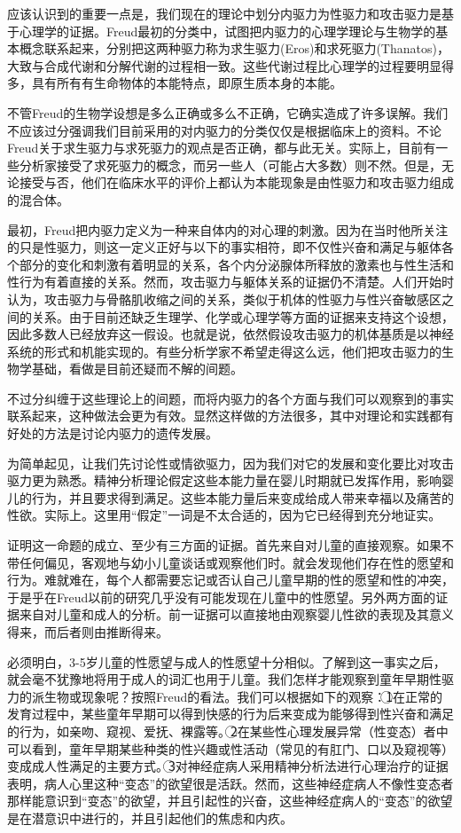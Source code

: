 \documentclass[UTF8,10pt,a4paper,openany]{book}
\newcommand{\quan}[1]{\textcircled{\small #1}}
\begin{document}
应该认识到的重要一点是，我们现在的理论中划分内驱力为性驱力和攻击驱力是基于心理学的证据。Freud最初的分类中，试图把内驱力的心理学理论与生物学的基本概念联系起来，分别把这两种驱力称为求生驱力(Eros)和求死驱力(Thanatos)，大致与合成代谢和分解代谢的过程相一致。这些代谢过程比心理学的过程要明显得多，具有所有有生命物体的本能特点，即原生质本身的本能。

不管Freud的生物学设想是多么正确或多么不正确，它确实造成了许多误解。我们不应该过分强调我们目前采用的对内驱力的分类仅仅是根据临床上的资料。不论Freud关于求生驱力与求死驱力的观点是否正确，都与此无关。实际上，目前有一些分析家接受了求死驱力的概念，而另一些人（可能占大多数）则不然。但是，无论接受与否，他们在临床水平的评价上都认为本能现象是由性驱力和攻击驱力组成的混合体。

最初，Freud把内驱力定义为一种来自体内的对心理的刺激。因为在当时他所关注的只是性驱力，则这一定义正好与以下的事实相符，即不仅性兴奋和满足与躯体各个部分的变化和刺激有着明显的关系，各个内分泌腺体所释放的激素也与性生活和性行为有着直接的关系。然而，攻击驱力与躯体关系的证据仍不清楚。人们开始时认为，攻击驱力与骨骼肌收缩之间的关系，类似于机体的性驱力与性兴奋敏感区之间的关系。由于目前还缺乏生理学、化学或心理学等方面的证据来支持这个设想，因此多数人已经放弃这一假设。也就是说，依然假设攻击驱力的机体基质是以神经系统的形式和机能实现的。有些分析学家不希望走得这么远，他们把攻击驱力的生物学基础，看做是目前还疑而不解的间题。

不过分纠缠于这些理论上的间题，而将内驱力的各个方面与我们可以观察到的事实联系起来，这种做法会更为有效。显然这样做的方法很多，其中对理论和实践都有好处的方法是讨论内驱力的遗传发展。

为简单起见，让我们先讨论性或情欲驱力，因为我们对它的发展和变化要比对攻击驱力更为熟悉。精神分析理论假定这些本能力量在婴儿时期就已发挥作用，影响婴儿的行为，并且要求得到满足。这些本能力量后来变成给成人带来幸福以及痛苦的性欲。实际上。这里用“假定”一词是不太合适的，因为它已经得到充分地证实。

证明这一命题的成立、至少有三方面的证据。首先来自对儿童的直接观察。如果不带任何偏见，客观地与幼小儿童谈话或观察他们时。就会发现他们存在性的愿望和行为。难就难在，每个人都需要忘记或否认自己儿童早期的性的愿望和性的冲突，于是乎在Freud以前的研究几乎没有可能发现在儿童中的性愿望。另外两方面的证据来自对儿童和成人的分析。前一证据可以直接地由观察婴儿性欲的表现及其意义得来，而后者则由推断得来。

必须明白，3-5岁儿童的性愿望与成人的性愿望十分相似。了解到这一事实之后，就会毫不犹豫地将用于成人的词汇也用于儿童。我们怎样才能观察到童年早期性驱力的派生物或现象呢？按照Freud的看法。我们可以根据如下的观察：\quan{1}在正常的发育过程中，某些童年早期可以得到快感的行为后来变成为能够得到性兴奋和满足的行为，如亲吻、窥视、爱抚、裸露等。\quan{2}在某些性心理发展异常（性变态）者中可以看到，童年早期某些种类的性兴趣或性活动（常见的有肛门、口以及窥视等）变成成人性满足的主要方式。\quan{3}对神经症病人采用精神分析法进行心理治疗的证据表明，病人心里这种“变态”的欲望很是活跃。然而，这些神经症病人不像性变态者那样能意识到“变态”的欲望，并且引起性的兴奋，这些神经症病人的“变态”的欲望是在潜意识中进行的，并且引起他们的焦虑和内疚。
\end{document}
